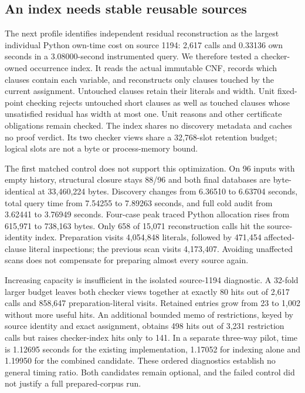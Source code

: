 \documentclass[11pt,a4paper]{article}
\numberwithin{equation}{section}
\theoremstyle{plain}
\theoremstyle{definition}
\theoremstyle{remark}
\begin{document}
\subsection{An index needs stable reusable sources}
\label{sec:indexed-check-limits}

The next profile identifies independent residual reconstruction as the largest individual Python own-time cost on source 1194: 2,617 calls and 0.33136 own seconds in a 3.08000-second instrumented query. We therefore tested a checker-owned occurrence index. It reads the actual immutable CNF, records which clauses contain each variable, and reconstructs only clauses touched by the current assignment. Untouched clauses retain their literals and width. Unit fixed-point checking rejects untouched short clauses as well as touched clauses whose unsatisfied residual has width at most one. Unit reasons and other certificate obligations remain checked. The index shares no discovery metadata and caches no proof verdict. Its two checker views share a 32,768-slot retention budget; logical slots are not a byte or process-memory bound.

The first matched control does not support this optimization. On 96 inputs with empty history, structural closure stays 88/96 and both final databases are byte-identical at 33,460,224 bytes. Discovery changes from 6.36510 to 6.63704 seconds, total query time from 7.54255 to 7.89263 seconds, and full cold audit from 3.62441 to 3.76949 seconds. Four-case peak traced Python allocation rises from 615,971 to 738,163 bytes. Only 658 of 15,071 reconstruction calls hit the source-identity index. Preparation visits 4,054,848 literals, followed by 471,454 affected-clause literal inspections; the previous scan visits 4,173,407. Avoiding unaffected scans does not compensate for preparing almost every source again.

Increasing capacity is insufficient in the isolated source-1194 diagnostic. A 32-fold larger budget leaves both checker views together at exactly 80 hits out of 2,617 calls and 858,647 preparation-literal visits. Retained entries grow from 23 to 1,002 without more useful hits. An additional bounded memo of restrictions, keyed by source identity and exact assignment, obtains 498 hits out of 3,231 restriction calls but raises checker-index hits only to 141. In a separate three-way pilot, time is 1.12695 seconds for the existing implementation, 1.17052 for indexing alone and 1.19950 for the combined candidate. These ordered diagnostics establish no general timing ratio. Both candidates remain optional, and the failed control did not justify a full prepared-corpus run.
\end{document}
